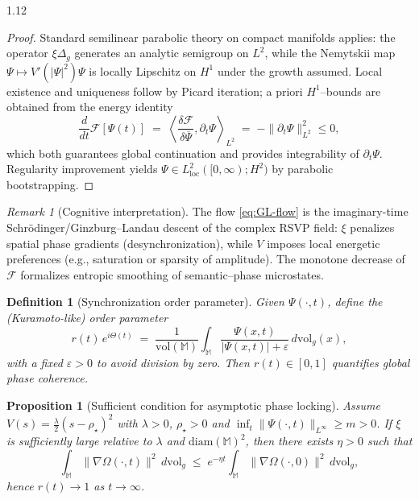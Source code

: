 \documentclass[12pt,a4paper]{article}
\numberwithin{equation}{section}
\newtheorem{definition}{Definition}[section]
\newtheorem{proposition}{Proposition}[section]
\theoremstyle{remark}
\newtheorem{remark}{Remark}[section]
\theoremstyle{definition}
\begin{document}
\begin{spacing}{1.12}
\begin{proof}
Standard semilinear parabolic theory on compact manifolds applies:
the operator $\xi\Delta_g$ generates an analytic semigroup on $L^2$, while the Nemytskii map $\Psi\mapsto V'(|\Psi|^2)\Psi$ is locally Lipschitz on $H^1$ under the growth assumed.
Local existence and uniqueness follow by Picard iteration; a priori $H^1$–bounds are obtained from the energy identity
\[
\frac{d}{dt}\mathcal{F}[\Psi(t)] \;=\; \left\langle \frac{\delta\mathcal{F}}{\delta\overline{\Psi}},\partial_t\Psi\right\rangle_{L^2}
\;=\;-\|\partial_t\Psi\|_{L^2}^2\le 0,
\]
which both guarantees global continuation and provides integrability of $\partial_t\Psi$.
Regularity improvement yields $\Psi\in L^2_{\mathrm{loc}}([0,\infty);H^2)$ by parabolic bootstrapping. 
\end{proof}

\begin{remark}[Cognitive interpretation]
The flow \eqref{eq:GL-flow} is the imaginary-time Schrödinger/Ginzburg–Landau descent of the complex RSVP field: $\xi$ penalizes spatial phase gradients (desynchronization), while $V$ imposes local energetic preferences (e.g., saturation or sparsity of amplitude). The monotone decrease of $\mathcal{F}$ formalizes entropic smoothing of semantic–phase microstates.
\end{remark}

\begin{definition}[Synchronization order parameter]
Given $\Psi(\cdot,t)$, define the (Kuramoto-like) order parameter
\begin{equation}
\label{eq:order-parameter}
r(t)\,e^{i\Theta(t)}\;=\;\frac{1}{\mathrm{vol}(\mathbb{M})}\int_{\mathbb{M}}\!\frac{\Psi(x,t)}{|\Psi(x,t)|+\varepsilon}\,d\mathrm{vol}_g(x),
\end{equation}
with a fixed $\varepsilon>0$ to avoid division by zero. Then $r(t)\in[0,1]$ quantifies global phase coherence.
\end{definition}

\begin{proposition}[Sufficient condition for asymptotic phase locking]
\label{prop:locking}
Assume $V(s)=\frac{\lambda}{2}(s-\rho_\star)^2$ with $\lambda>0$, $\rho_\star>0$ and $\inf_{t}\|\Psi(\cdot,t)\|_{L^\infty}\ge m>0$.
If $\xi$ is sufficiently large relative to $\lambda$ and $\mathrm{diam}(\mathbb{M})^2$, then there exists $\eta>0$ such that
\begin{equation}
\int_{\mathbb{M}}\|\nabla \Omega(\cdot,t)\|^2\,d\mathrm{vol}_g \;\le\; e^{-\eta t}\int_{\mathbb{M}}\|\nabla \Omega(\cdot,0)\|^2\,d\mathrm{vol}_g,
\end{equation}
hence $r(t)\to 1$ as $t\to\infty$.
\end{proposition}


\end{spacing}
\end{document}
